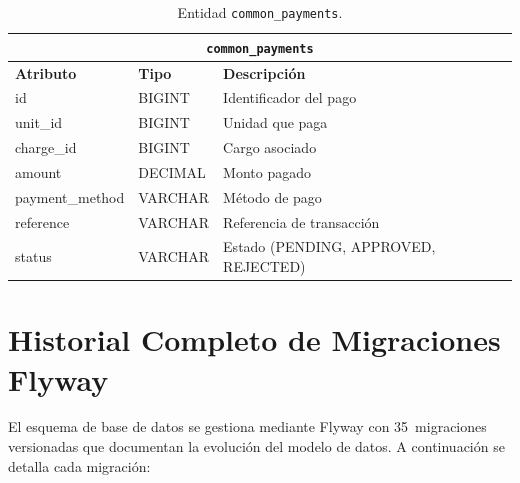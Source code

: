 \begin{table}[H]
\centering
\small
\begin{tabular}{|p{}|p{}|p{}|}
\hline
\multicolumn{3}{|c|}{\textbf{\texttt{common\_payments}}} \\ \hline
\textbf{Atributo} & \textbf{Tipo} & \textbf{Descripción} \\ \hline
id & BIGINT & Identificador del pago \\ \hline
unit\_id & BIGINT & Unidad que paga \\ \hline
charge\_id & BIGINT & Cargo asociado \\ \hline
amount & DECIMAL & Monto pagado \\ \hline
payment\_method & VARCHAR & Método de pago \\ \hline
reference & VARCHAR & Referencia de transacción \\ \hline
status & VARCHAR & Estado (PENDING, APPROVED, REJECTED) \\ \hline
\end{tabular}
\caption{Entidad \texttt{common\_payments}.}
\end{table}

\section{Historial Completo de Migraciones Flyway}

El esquema de base de datos se gestiona mediante Flyway con 35~migraciones versionadas que documentan la evolución del modelo de datos. A continuación se detalla cada migración:

